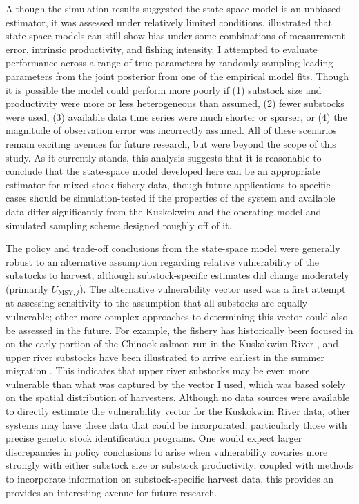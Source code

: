 \documentclass[12pt,]{book}
\theoremstyle{definition}
\theoremstyle{definition}
\theoremstyle{definition}
\theoremstyle{remark}
\begin{document}
Although the simulation results suggested the state-space model is an
unbiased estimator, it was assessed under relatively limited conditions.
\citet{su-peterman-2012} illustrated that state-space models can still
show bias under some combinations of measurement error, intrinsic
productivity, and fishing intensity. I attempted to evaluate performance
across a range of true parameters by randomly sampling leading
parameters from the joint posterior from one of the empirical model
fits. Though it is possible the model could perform more poorly if (1)
substock size and productivity were more or less heterogeneous than
assumed, (2) fewer substocks were used, (3) available data time series
were much shorter or sparser, or (4) the magnitude of observation error
was incorrectly assumed. All of these scenarios remain exciting avenues
for future research, but were beyond the scope of this study. As it
currently stands, this analysis suggests that it is reasonable to
conclude that the state-space model developed here can be an appropriate
estimator for mixed-stock fishery data, though future applications to
specific cases should be simulation-tested if the properties of the
system and available data differ significantly from the Kuskokwim and
the operating model and simulated sampling scheme designed roughly off
of it.

The policy and trade-off conclusions from the state-space model were
generally robust to an alternative assumption regarding relative
vulnerability of the substocks to harvest, although substock-specific
estimates did change moderately (primarily \(U_{\text{MSY},j}\)). The
alternative vulnerability vector used was a first attempt at assessing
sensitivity to the assumption that all substocks are equally vulnerable;
other more complex approaches to determining this vector could also be
assessed in the future. For example, the fishery has historically been
focused in on the early portion of the Chinook salmon run in the
Kuskokwim River \citep{hamazaki-2008}, and upper river substocks have
been illustrated to arrive earliest in the summer migration
\citep{smith-liller-2017a, smith-liller-2017b}. This indicates that
upper river substocks may be even more vulnerable than what was captured
by the vector I used, which was based solely on the spatial distribution
of harvesters. Although no data sources were available to directly
estimate the vulnerability vector for the Kuskokwim River data, other
systems may have these data that could be incorporated, particularly
those with precise genetic stock identification programs. One would
expect larger discrepancies in policy conclusions to arise when
vulnerability covaries more strongly with either substock size or
substock productivity; coupled with methods to incorporate information
on substock-specific harvest data, this provides an provides an
interesting avenue for future research.
\end{document}
